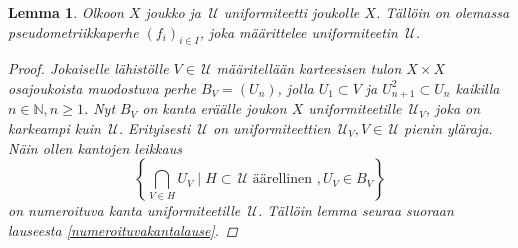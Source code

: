 \documentclass[12pt,a4paper,leqno]{report}
\newcommand{\N}{\mathbb{N}}
\newcommand{\U}{\,\mathcal{U}}
\theoremstyle{plain}
\newtheorem{lem}[equation]{Lemma}
\theoremstyle{definition}
\theoremstyle{remark}
\begin{document}
\begin{lem}\label{pseudo_uniformista}
Olkoon $X$ joukko ja $\U$ uniformiteetti joukolle $X$. 
Tällöin on olemassa pseudometriikkaperhe $(f_i)_{i\in I}$, joka määrittelee uniformiteetin $\U$.
\begin{proof}
Jokaiselle lähistölle $V\in\U$ määritellään karteesisen tulon $X\times X$ osajoukoista muodostuva perhe $B_V=(U_n)$, 
jolla $U_1\subset V$ ja $U_{n+1}^2\subset U_n$ kaikilla $n\in\N, n\geq 1$. 
Nyt $B_V$ on kanta eräälle joukon $X$ uniformiteetille $\U_V$, 
joka on karkeampi kuin $\U$. 
Erityisesti $\U$ on uniformiteettien 
$\U_V,V\in\U$ pienin yläraja. %
Näin ollen kantojen leikkaus
$$\left\{\bigcap_{V\in H}U_V\mid H\subset\U \text{ äärellinen }, U_V\in B_V\right\}$$
on numeroituva kanta uniformiteetille $\U$.
Tällöin lemma seuraa suoraan lauseesta \ref{numeroituvakantalause}.
\end{proof}
\end{lem}
\end{document}
